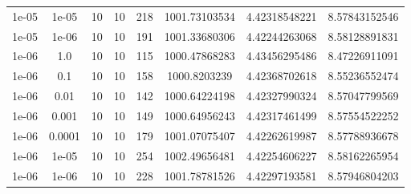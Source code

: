 \documentclass[11pt,a4paper]{article}
\begin{document}
\begin{table}
{\begin{tabular}{*{8}c}
 1e-05 & 1e-05 &10 &10 & 218& 1001.73103534 & 4.42318548221 & 8.57843152546 \\
 1e-05 & 1e-06 &10 &10 & 191& 1001.33680306 & 4.42244263068 & 8.58128891831 \\
 1e-06 & 1.0 &10 &10 & 115& 1000.47868283 & 4.43456295486 & 8.47226911091 \\
 1e-06 & 0.1 &10 &10 & 158& 1000.8203239 & 4.42368702618 & 8.55236552474 \\
 1e-06 & 0.01 &10 &10 & 142& 1000.64224198 & 4.42327990324 & 8.57047799569 \\
 1e-06 & 0.001 &10 &10 & 149& 1000.64956243 & 4.42317461499 & 8.57554522252 \\
 1e-06 & 0.0001 &10 &10 & 179& 1001.07075407 & 4.42262619987 & 8.57788936678 \\
 1e-06 & 1e-05 &10 &10 & 254& 1002.49656481 & 4.42254606227 & 8.58162265954 \\
 1e-06 & 1e-06 &10 &10 & 228& 1001.78781526 & 4.42297193581 & 8.57946804203 \\
\end{tabular}}
\label{Tab::1}
\end{table} 
\end{document}
